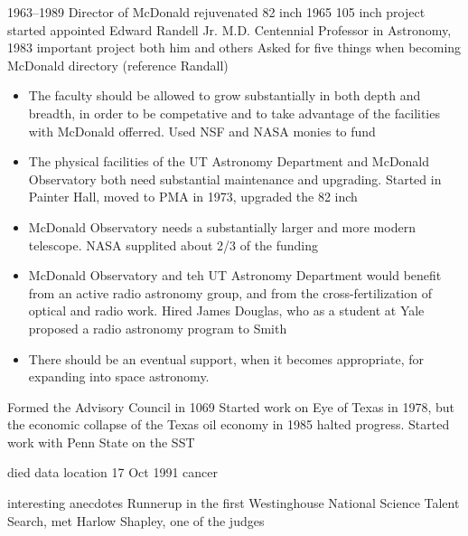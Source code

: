 1963--1989 Director of McDonald
rejuvenated 82 inch
1965 105 inch project started
appointed Edward Randell Jr. M.D. Centennial Professor in Astronomy, 1983
important project both him and others
Asked for five things when becoming McDonald directory
(reference Randall)
\begin{itemize}
  \item The faculty should be allowed to grow substantially in both
  depth and breadth, in order to be competative and to take advantage of
  the facilities with McDonald offerred.
    Used NSF and NASA monies to fund 
  \item The physical facilities of the UT Astronomy Department and
  McDonald Observatory both need substantial maintenance and upgrading.
    Started in Painter Hall, moved to PMA in 1973, upgraded the 82 inch
  \item McDonald Observatory needs a substantially larger and more
  modern telescope.
     NASA supplited about 2/3 of the funding
  \item McDonald Observatory and teh UT Astronomy Department would benefit
  from an active radio astronomy group, and from the cross-fertilization
  of optical and radio work.
    Hired James Douglas, who as a student at Yale proposed a radio
    astronomy program to Smith
  \item There should be an eventual support, when it becomes appropriate,
  for expanding into space astronomy.
\end{itemize}

Formed the Advisory Council in 1069
Started work on Eye of Texas in 1978, but the economic collapse
of the Texas oil economy in 1985 halted progress.  Started work
with Penn State on the SST

died data location 17 Oct 1991 cancer

interesting anecdotes
Runnerup in the first Westinghouse National Science Talent Search, met
Harlow Shapley, one of the judges
